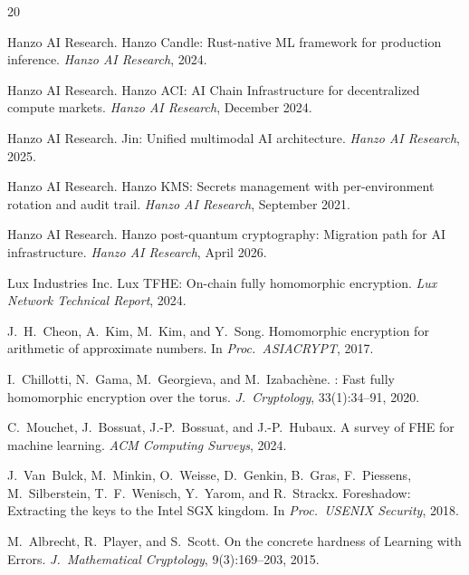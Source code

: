 \begin{thebibliography}{20}

{Hanzo AI Research}.
\newblock Hanzo Candle: Rust-native {ML} framework for production inference.
\newblock \emph{Hanzo AI Research}, 2024.

{Hanzo AI Research}.
\newblock Hanzo {ACI}: {AI} Chain Infrastructure for decentralized compute markets.
\newblock \emph{Hanzo AI Research}, December 2024.

{Hanzo AI Research}.
\newblock Jin: Unified multimodal {AI} architecture.
\newblock \emph{Hanzo AI Research}, 2025.

{Hanzo AI Research}.
\newblock Hanzo {KMS}: Secrets management with per-environment rotation and audit trail.
\newblock \emph{Hanzo AI Research}, September 2021.

{Hanzo AI Research}.
\newblock Hanzo post-quantum cryptography: Migration path for {AI} infrastructure.
\newblock \emph{Hanzo AI Research}, April 2026.

{Lux Industries Inc}.
\newblock Lux {TFHE}: On-chain fully homomorphic encryption.
\newblock \emph{Lux Network Technical Report}, 2024.

J.~H.~Cheon, A.~Kim, M.~Kim, and Y.~Song.
\newblock Homomorphic encryption for arithmetic of approximate numbers.
\newblock In \emph{Proc.\ ASIACRYPT}, 2017.

I.~Chillotti, N.~Gama, M.~Georgieva, and M.~Izabach\`ene.
: Fast fully homomorphic encryption over the torus.
\newblock \emph{J.\ Cryptology}, 33(1):34--91, 2020.

C.~Mouchet, J.~Bossuat, J.-P.~Bossuat, and J.-P.~Hubaux.
\newblock A survey of {FHE} for machine learning.
\newblock \emph{ACM Computing Surveys}, 2024.

J.~Van~Bulck, M.~Minkin, O.~Weisse, D.~Genkin, B.~Gras, F.~Piessens, M.~Silberstein, T.~F.~Wenisch, Y.~Yarom, and R.~Strackx.
\newblock Foreshadow: Extracting the keys to the {Intel SGX} kingdom.
\newblock In \emph{Proc.\ USENIX Security}, 2018.

M.~Albrecht, R.~Player, and S.~Scott.
\newblock On the concrete hardness of {Learning with Errors}.
\newblock \emph{J.\ Mathematical Cryptology}, 9(3):169--203, 2015.


\end{thebibliography}
